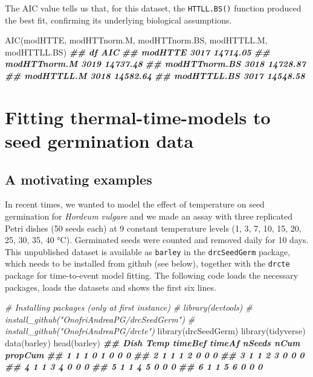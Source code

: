 \documentclass[
]{book}
\newenvironment{Shaded}{\begin{snugshade}}{\end{snugshade}}
\newcommand{\CommentTok}[1]{\textcolor[rgb]{0.56,0.35,0.01}{\textit{#1}}}
\newcommand{\DocumentationTok}[1]{\textcolor[rgb]{0.56,0.35,0.01}{\textbf{\textit{#1}}}}
\newcommand{\FunctionTok}[1]{\textcolor[rgb]{0.00,0.00,0.00}{#1}}
\newcommand{\NormalTok}[1]{#1}
\begin{document}
The AIC value tells us that, for this dataset, the \texttt{HTTLL.BS()} function produced the best fit, confirming its underlying biological assumptions.

\begin{Shaded}
\begin{Highlighting}[]
\FunctionTok{AIC}\NormalTok{(modHTTE, modHTTnorm.M, modHTTnorm.BS, modHTTLL.M, modHTTLL.BS)}
\DocumentationTok{\#\#                 df      AIC}
\DocumentationTok{\#\# modHTTE       3017 14714.05}
\DocumentationTok{\#\# modHTTnorm.M  3019 14737.48}
\DocumentationTok{\#\# modHTTnorm.BS 3018 14728.87}
\DocumentationTok{\#\# modHTTLL.M    3018 14582.64}
\DocumentationTok{\#\# modHTTLL.BS   3017 14548.58}
\end{Highlighting}
\end{Shaded}

\hypertarget{fitting-thermal-time-models-to-seed-germination-data}{%
\section{Fitting thermal-time-models to seed germination data}\label{fitting-thermal-time-models-to-seed-germination-data}}

\hypertarget{a-motivating-examples}{%
\subsection{A motivating examples}\label{a-motivating-examples}}

In recent times, we wanted to model the effect of temperature on seed germination for \emph{Hordeum vulgare} and we made an assay with three replicated Petri dishes (50 seeds each) at 9 constant temperature levels (1, 3, 7, 10, 15, 20, 25, 30, 35, 40 °C). Germinated seeds were counted and removed daily for 10 days. This unpublished dataset is available as \texttt{barley} in the \texttt{drcSeedGerm} package, which needs to be installed from github (see below), together with the \texttt{drcte} package for time-to-event model fitting. The following code loads the necessary packages, loads the datasets and shows the first six lines.

\begin{Shaded}
\begin{Highlighting}[]
\CommentTok{\# Installing packages (only at first instance)}
\CommentTok{\# library(devtools)}
\CommentTok{\# install\_github("OnofriAndreaPG/drcSeedGerm")}
\CommentTok{\# install\_github("OnofriAndreaPG/drcte")}
\FunctionTok{library}\NormalTok{(drcSeedGerm)}
\FunctionTok{library}\NormalTok{(tidyverse)}
\FunctionTok{data}\NormalTok{(barley)}
\FunctionTok{head}\NormalTok{(barley)}
\DocumentationTok{\#\#   Dish Temp timeBef timeAf nSeeds nCum propCum}
\DocumentationTok{\#\# 1    1    1       0      1      0    0       0}
\DocumentationTok{\#\# 2    1    1       1      2      0    0       0}
\DocumentationTok{\#\# 3    1    1       2      3      0    0       0}
\DocumentationTok{\#\# 4    1    1       3      4      0    0       0}
\DocumentationTok{\#\# 5    1    1       4      5      0    0       0}
\DocumentationTok{\#\# 6    1    1       5      6      0    0       0}
\end{Highlighting}
\end{Shaded}
\end{document}
